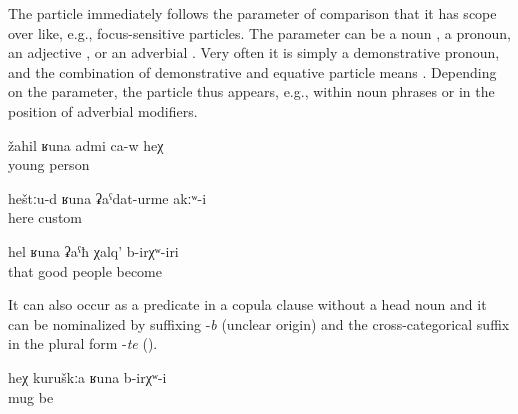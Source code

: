 The particle   immediately follows the parameter of comparison that it has scope over like, e.g., focus-sensitive particles. The parameter can be a noun , a pronoun, an adjective , or an adverbial . Very often it is simply a demonstrative pronoun, and the combination of demonstrative and equative particle means  . Depending on the parameter, the particle thus appears, e.g., within noun phrases  or in the position of adverbial modifiers.
%
\begin{exe}
	\ex	\label{ex:He is like a young man}
	\gll	žahil	ʁuna	admi	ca-w	heχ\\
		young		person		\\
	\glt	{}

	\ex	\label{ex:There were not such customs as here}
	\gll	heštːu-d	ʁuna	ʡaˁdat-urme	akːʷ-i\\
		here		custom	\\
	\glt	{}

	\ex	\label{ex:They were so good people}
	\gll	hel	ʁuna	ʡaˁħ	χalq'	b-irχʷ-iri\\
		that		good	people	become\\
	\glt	{}
\end{exe}

It can also occur as a predicate in a copula clause without a head noun and it can be nominalized by suffixing -\textit{b} (unclear origin) and the cross-categorical suffix in the plural form -\textit{te} ().
%
\begin{exe}
	\ex	\label{ex:This was like a mug}
	\gll	heχ	kuruškːa	ʁuna	b-irχʷ-i\\
			mug 	be\\
	\glt	{}
\end{exe}

